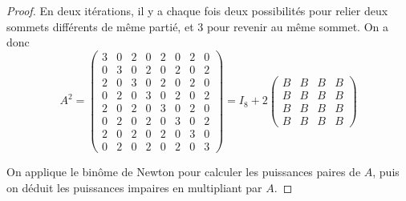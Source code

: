 \begin{proof}
    En deux itérations, il y a chaque fois deux possibilités pour relier deux sommets différents de même partié, et 3 pour revenir au même sommet. On a donc 
    \begin{equation}
        A^{2}=
        \begin{pmatrix}
            3 &0 &2 &0 &2 &0 &2 &0\\
            0 &3 &0 &2 &0 &2 &0 &2\\
            2 &0 &3 &0 &2 &0 &2 &0\\
            0 &2 &0 &3 &0 &2 &0 &2\\
            2 &0 &2 &0 &3 &0 &2 &0\\
            0 &2 &0 &2 &0 &3 &0 &2\\
            2 &0 &2 &0 &2 &0 &3 &0\\
            0 &2 &0 &2 &0 &2 &0 &3
        \end{pmatrix}
        =I_{8}+2
        \begin{pmatrix}
            B &B &B &B\\
            B &B &B &B\\
            B &B &B &B\\
            B &B &B &B
        \end{pmatrix}
    \end{equation}

    On applique le binôme de Newton pour calculer les puissances paires de $A$, puis on déduit les puissances impaires en multipliant par $A$.
\end{proof}

